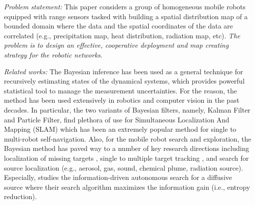 \documentclass[journal]{IEEEtran}
\begin{document}
\textit{Problem statement:}
This paper considers a group of homogeneous mobile robots equipped with range sensors tasked with building a spatial distribution map of a bounded domain where the data and the spatial coordinates of the data are correlated (e.g., precipitation map, heat distribution, radiation map, etc). \emph{The problem is to design an effective, cooperative deployment and map creating strategy for the robotic networks}.




\textit{Related works:} The Bayesian inference has been used as a general technique for recursively estimating states of the dynamical systems, which provides powerful statistical tool to manage the measurement uncertainties.
For the reason, the method has been used extensively in robotics \cite{thrun2005probabilistic} and computer vision \cite{ponce2011computer} in the past decades. In particular, the two variants of Bayesian filters, namely, Kalman Filter and Particle Filter, find plethora of use for Simultaneous Localization And Mapping (SLAM) which has been an extremely popular method for single to multi-robot self-navigation.
Also, for the mobile robot search and exploration, the Bayesian method has paved way to a number of key research directions including
localization of missing targets \cite{bourgault2003coordinated}, single to multiple target tracking \cite{stone2013bayesian}, and 
search for source localization \cite{ristic2010information,valin2007robust} (e.g., aerosol, gas, sound, chemical plume, radiation source). 
Especially, \cite{ristic2010information} studies the information-driven autonomous search for a diffusive source
where their search algorithm maximizes the information gain (i.e., entropy reduction).
\end{document}
